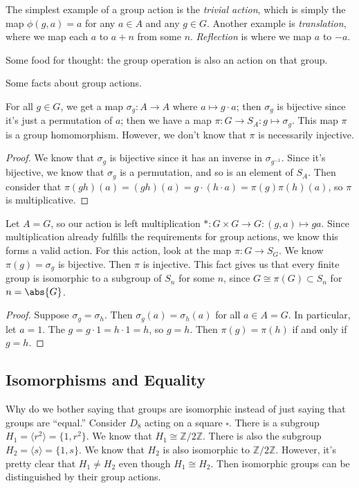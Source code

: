 The simplest example of a group action is the \emph{trivial action}, which is simply the map $\phi(g,a) = a$ for any $a \in A$ and any $g \in G$. Another example is \emph{translation}, where we map each $a$ to $a + n$ from some $n$. \emph{Reflection} is where we map $a$ to $-a$.

\begin{example}
Some food for thought: the group operation is also an action on that group.
\end{example}

Some facts about group actions.
\begin{lemma}
For all $g \in G$, we get a map $\sigma_g : A \to A$ where $a \mapsto g\cdot a$; then $\sigma_g$ is bijective since it's just a permutation of $a$; then we have a map $\pi : G \to S_A : g \mapsto \sigma_g$.
This map $\pi$ is a group homomorphism. However, we don't know that $\pi$ is necessarily injective.
\end{lemma}
\begin{proof}
We know that $\sigma_g$ is bijective since it has an inverse in $\sigma_{g^{-1}}$. Since it's bijective, we know that $\sigma_g$ is a permutation, and so is an element of $S_A$. Then consider that $\pi(gh)(a) =  (gh)(a) = g \cdot (h \cdot a) = \pi(g)\pi(h)(a)$, so $\pi$ is multiplicative.
\end{proof}

\begin{example}
Let $A = G$, so our action is left multiplication $\ast : G \times G \to G : (g,a) \mapsto ga$. Since multiplication already fulfills the requirements for group actions, we know this forms a valid action. For this action, look at the map $\pi : G \to S_G$. We know $\pi(g) = \sigma_g$ is bijective. Then $\pi$ is injective. This fact gives us that every finite group is isomorphic to a subgroup of $S_n$ for some $n$, since $G \cong \pi(G) \subset S_n$ for $n = \abs{G}$.

\begin{proof}
Suppose $\sigma_g = \sigma_h$. Then $\sigma_g(a) = \sigma_h(a)$ for all $a \in A = G$. In particular, let $a = 1$. The $g = g \cdot 1 = h \cdot 1 = h$, so $g = h$. Then $\pi(g) = \pi(h)$ if and only if $g = h$.
\end{proof}
\end{example}

\subsection{Isomorphisms and Equality}
Why do we bother saying that groups are isomorphic instead of just saying that groups are ``equal.'' Consider $D_{8}$ acting on a square $\square$. There is a subgroup $H_1 = \langle r^2 \rangle = \{1, r^2\}$. We know that $H_1 \cong \mathbb{Z}/2\mathbb{Z}$. There is also the subgroup $H_2 = \langle s \rangle = \{1,s\}$. We know that $H_2$ is also isomorphic to $\mathbb{Z}/2\mathbb{Z}$. However, it's pretty clear that $H_1 \not= H_2$ even though $H_1 \cong H_2$. Then isomorphic groups can be distinguished by their group actions.